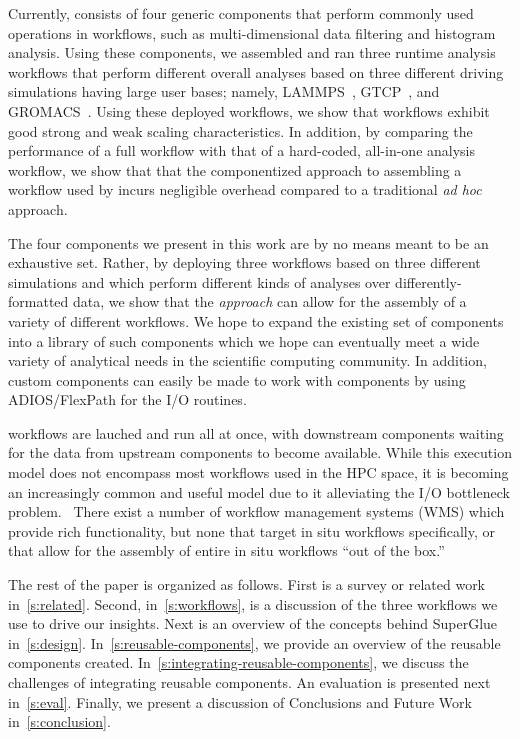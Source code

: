 Currently, \sys consists of four generic components that
perform commonly used operations in workflows, such
as multi-dimensional data filtering and histogram
analysis. Using these components, we assembled
and ran three runtime analysis workflows that perform
different overall analyses
based on three different driving simulations
having large user bases; namely,
LAMMPS~\cite{plimpton:1997:lammps},
GTCP~\cite{lin:gtc},
and GROMACS~\cite{hess2008gromacs}.
Using these deployed workflows,
we show that \sys workflows exhibit
good strong and weak scaling characteristics.
In addition, by comparing the performance
of a full \sys workflow with that of a
hard-coded, all-in-one analysis workflow,
we show that that the componentized approach to
assembling a workflow used by \sys
incurs negligible overhead compared
to a traditional \textit{ad hoc} approach.

The four components we present in this work
are by no means meant to be an exhaustive set.
Rather, by deploying three workflows
based on three different simulations
and which perform different kinds of
analyses over differently-formatted data,
we show that the \sys \textit{approach}
can allow for the assembly
of a variety of different workflows.
We hope to expand the existing set of
components into a library of such components
which we hope can eventually meet
a wide variety of analytical needs in the
scientific computing community.
In addition, custom components
can easily be made to work with
\sys components by using ADIOS/FlexPath
for the I/O routines.

\sys workflows are lauched and run all at once,
with downstream components waiting for
the data from upstream components to become
available.
While this execution model does not encompass
most workflows used in the HPC space, it
is becoming an increasingly common and useful model
due to it alleviating the I/O bottleneck problem.~\cite{ayachit2016performance}
There exist a number of workflow management systems (WMS)
which provide rich functionality, but none
that target in situ workflows specifically,
or that allow for the assembly of entire
in situ workflows ``out of the box.''

The rest of the paper is organized as follows. First is a survey or related
work in~\autoref{s:related}. Second, in~\autoref{s:workflows}, is a
discussion of the three workflows we use to drive our insights. Next is an
overview of the concepts behind SuperGlue in~\autoref{s:design}.
In~\autoref{s:reusable-components}, we provide an overview of the reusable
components created. In~\autoref{s:integrating-reusable-components}, we
discuss the challenges of integrating reusable components.  An evaluation is
presented next in~\autoref{s:eval}. Finally, we present a discussion of Conclusions
and Future Work in~\autoref{s:conclusion}.


